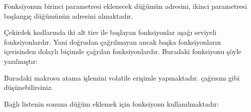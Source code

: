 \documentclass[a4paper,10pt,turkish]{sphinxmanual}
\begin{document}
\sphinxAtStartPar
Fonksiyonun birinci parametresi eklenecek düğümün adresini, ikinci parametresi başlangıç düğümünün
adresini almaktadır.

\sphinxAtStartPar
Çekirdek kodlarında iki alt tire ile başlayan fonksiyonlar aşağı seviyeli fonksiyonlardır. Yani doğrudan
çağrılmayan ancak başka fonksiyonların içerisinden dolaylı biçimde çağrılan fonksiyonlardır. Buradaki
 fonksiyonu şöyle yazılmıştır:

\begin{sphinxVerbatim}[commandchars=\\\{\}]

\end{sphinxVerbatim}

\sphinxAtStartPar
Buradaki  makrosu atama işlemini volatile erişimle yapmaktadır. 
çağrısını  gibi düşünebilirsiniz.

\sphinxAtStartPar
Bağlı listenin sonuna düğüm eklemek için  fonksiyonu kullanılmaktadır:
\end{document}
